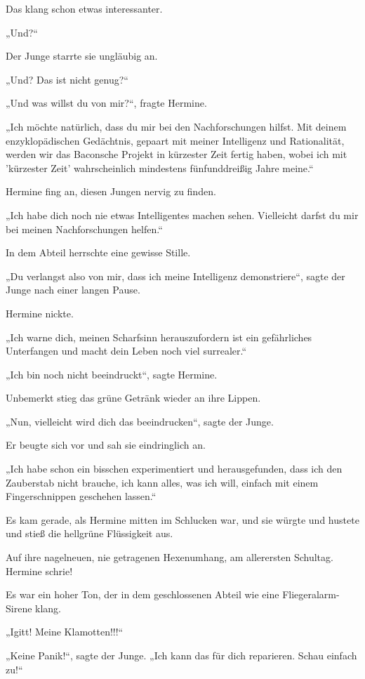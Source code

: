 {Das klang schon etwas interessanter.

„Und?“

Der Junge starrte sie ungläubig an.

„Und? Das ist nicht genug?“

„Und was willst du von mir?“, fragte Hermine.

„Ich möchte natürlich, dass du mir bei den Nachforschungen hilfst. Mit deinem enzyklopädischen Gedächtnis, gepaart mit meiner Intelligenz und Rationalität, werden wir das Baconsche Projekt in kürzester Zeit fertig haben, wobei ich mit 'kürzester Zeit' wahrscheinlich mindestens fünfunddreißig Jahre meine.“

Hermine fing an, diesen Jungen nervig zu finden.

„Ich habe dich noch nie etwas Intelligentes machen sehen. Vielleicht darfst du mir bei meinen Nachforschungen helfen.“

In dem Abteil herrschte eine gewisse Stille.

„Du verlangst also von mir, dass ich meine Intelligenz demonstriere“, sagte der Junge nach einer langen Pause.

Hermine nickte.

„Ich warne dich, meinen Scharfsinn herauszufordern ist ein gefährliches Unterfangen und macht dein Leben noch viel surrealer.“

„Ich bin noch nicht beeindruckt“, sagte Hermine.

Unbemerkt stieg das grüne Getränk wieder an ihre Lippen.

„Nun, vielleicht wird dich das beeindrucken“, sagte der Junge.

Er beugte sich vor und sah sie eindringlich an.

„Ich habe schon ein bisschen experimentiert und herausgefunden, dass ich den Zauberstab nicht brauche, ich kann alles, was ich will, einfach mit einem Fingerschnippen geschehen lassen.“

Es kam gerade, als Hermine mitten im Schlucken war, und sie würgte und hustete und stieß die hellgrüne Flüssigkeit aus.

Auf ihre nagelneuen, nie getragenen Hexenumhang, am allerersten Schultag. Hermine schrie!

Es war ein hoher Ton, der in dem geschlossenen Abteil wie eine Fliegeralarm-Sirene klang.

„Igitt! Meine Klamotten!!!“

„Keine Panik!“, sagte der Junge. „Ich kann das für dich reparieren. Schau einfach zu!“

}
